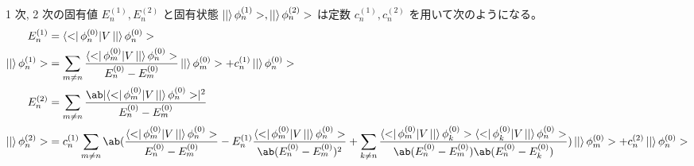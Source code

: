 \documentclass[uplatex,dvipdfmx,a4paper,11pt]{jlreq}
\numberwithin{equation}{section}
\theoremstyle{definition}
\begin{document}
\begin{proposition}
  1 次, 2 次の固有値 $E_n^{(1)}, E_n^{(2)}$ と固有状態 $\ket|\phi_n^{(1)}>, \ket|\phi_n^{(2)}>$ は定数 $c_n^{(1)}, c_n^{(2)}$ を用いて次のようになる。
  \begin{align}
    E_n^{(1)}          & = \bra<\phi_n^{(0)}|V\ket|\phi_n^{(0)}>                                                                                                                                                                                                                                                                                                                                                         \\
    \ket|\phi_n^{(1)}> & = \sum_{m\neq n}\frac{\bra<\phi_m^{(0)}|V\ket|\phi_n^{(0)}>}{E_n^{(0)} - E_m^{(0)}}\ket|\phi_m^{(0)}> + c_n^{(1)}\ket|\phi_n^{(0)}>                                                                                                                                                                                                                                                             \\
    E_n^{(2)}          & = \sum_{m\neq n}\frac{\ab|{\bra<\phi_m^{(0)}|V\ket|\phi_n^{(0)}>}|^2}{E_n^{(0)} - E_m^{(0)}}                                                                                                                                                                                                                                                                                                    \\
    \ket|\phi_n^{(2)}> & = c_n^{(1)}\sum_{m\neq n}\ab(\frac{\bra<\phi_m^{(0)}|V\ket|\phi_n^{(0)}>}{E_n^{(0)} - E_m^{(0)}} - E_n^{(1)}\frac{\bra<\phi_m^{(0)}|V\ket|\phi_n^{(0)}>}{\ab(E_n^{(0)} - E_m^{(0)})^2} + \sum_{k\neq n}\frac{\bra<\phi_m^{(0)}|V\ket|\phi_k^{(0)}>\bra<\phi_k^{(0)}|V\ket|\phi_n^{(0)}>}{\ab(E_n^{(0)} - E_m^{(0)})\ab(E_n^{(0)} - E_k^{(0)})})\ket|\phi_m^{(0)}> + c_n^{(2)}\ket|\phi_n^{(0)}>
  \end{align}
\end{proposition}
\end{document}
